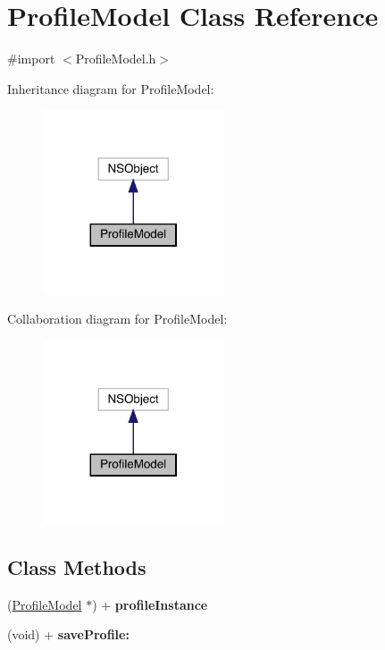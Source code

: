 \hypertarget{interface_profile_model}{}\section{Profile\+Model Class Reference}
\label{interface_profile_model}


{\ttfamily \#import $<$Profile\+Model.\+h$>$}



Inheritance diagram for Profile\+Model\+:\nopagebreak
\begin{figure}[H]
\begin{center}
\leavevmode
\includegraphics[width=152pt]{interface_profile_model__inherit__graph}
\end{center}
\end{figure}


Collaboration diagram for Profile\+Model\+:\nopagebreak
\begin{figure}[H]
\begin{center}
\leavevmode
\includegraphics[width=152pt]{interface_profile_model__coll__graph}
\end{center}
\end{figure}
\subsection*{Class Methods}
\begin{DoxyCompactItemize}
\item 
\mbox{\label{interface_profile_model_a366f2662196281159eb2d0a532eb6590}} 
(\mbox{\hyperlink{interface_profile_model}{Profile\+Model}} $\ast$) + {\bfseries profile\+Instance}
\item 
\mbox{\label{interface_profile_model_a104b65c504684c494e7da4bbab9b8a8b}} 
(void) + {\bfseries save\+Profile\+:}
\end{DoxyCompactItemize}
